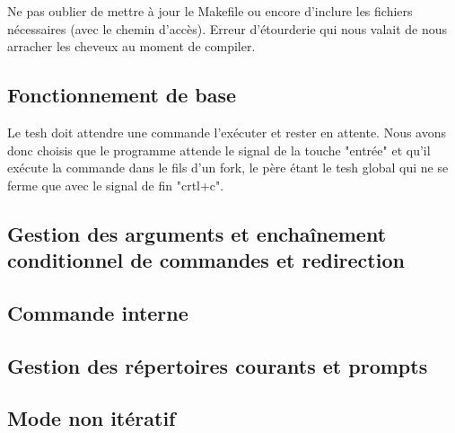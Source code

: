 \documentclass{article}
\begin{document}
Ne pas oublier de mettre à jour le Makefile ou encore d'inclure les fichiers nécessaires (avec le chemin d'accès). Erreur d'étourderie qui nous valait de nous arracher les cheveux au moment de compiler. 


\subsection{Fonctionnement de base}
Le tesh doit attendre une commande l'exécuter et rester en attente. Nous avons donc choisis que le programme attende le signal de la touche "entrée" et qu'il exécute la commande dans le fils d'un fork, le père étant le tesh global qui ne se ferme que avec le signal de fin "crtl+c". 

\subsection{Gestion des arguments et enchaînement conditionnel de commandes et redirection }
\subsection{Commande interne}

\subsection{Gestion des répertoires courants et prompts}

\subsection{Mode non itératif }
\end{document}
